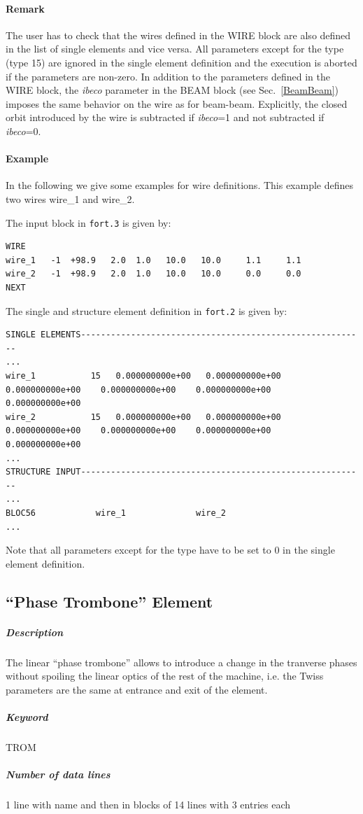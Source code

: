 \documentclass[a4paper,11pt]{report}
\begin{document}
\paragraph{Remark} The user has to check that the wires defined in the WIRE block are also defined in the list of single elements and vice versa. All parameters except for the type (type 15) are ignored in the single element definition and the execution is aborted if the parameters are non-zero. In addition to the parameters defined in the WIRE block, the \emph{ibeco} parameter in the BEAM block (see Sec.~\ref{BeamBeam}) imposes the same behavior on the wire as for beam-beam. Explicitly, the closed orbit introduced by the wire is subtracted if \emph{ibeco}=1 and not subtracted if \emph{ibeco}=0.

\paragraph{Example} In the following we give some examples for wire definitions. This example defines two wires wire\_1 and wire\_2.

The input block in \verb|fort.3| is given by:
\begin{verbatim}
WIRE
wire_1   -1  +98.9   2.0  1.0   10.0   10.0     1.1     1.1
wire_2   -1  +98.9   2.0  1.0   10.0   10.0     0.0     0.0
NEXT
\end{verbatim}
The single and structure element definition in \verb|fort.2| is given by:
\begin{verbatim}
SINGLE ELEMENTS---------------------------------------------------------
...
wire_1           15   0.000000000e+00   0.000000000e+00 
0.000000000e+00    0.000000000e+00    0.000000000e+00    0.000000000e+00
wire_2           15   0.000000000e+00   0.000000000e+00 
0.000000000e+00    0.000000000e+00    0.000000000e+00    0.000000000e+00
...
STRUCTURE INPUT---------------------------------------------------------
...
BLOC56            wire_1              wire_2
...
\end{verbatim}
Note that all parameters except for the type have to be set to 0 in the single element definition.

\subsection{``Phase Trombone'' Element} \label{Trombone}

\subparagraph{Description} The linear ``phase trombone'' allows to
introduce a change in the tranverse phases without spoiling the linear
optics of the rest of the machine, i.e. the Twiss parameters are the
same at entrance and exit of the element.  
\subparagraph{Keyword} TROM
\subparagraph{Number of data lines} 1 line with name and then in
blocks of 14 lines with 3 entries each
\end{document}
